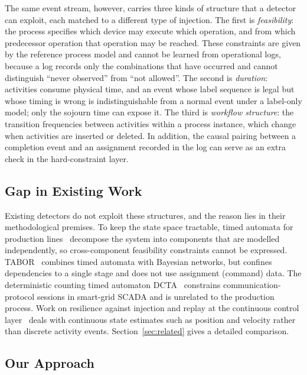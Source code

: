 \documentclass[manuscript,screen,review]{acmart}
\begin{document}
The same event stream, however, carries three kinds of structure that a detector can exploit, each matched to a different type of injection. The first is \emph{feasibility}: the process specifies which device may execute which operation, and from which predecessor operation that operation may be reached. These constraints are given by the reference process model and cannot be learned from operational logs, because a log records only the combinations that have occurred and cannot distinguish ``never observed'' from ``not allowed''. The second is \emph{duration}: activities consume physical time, and an event whose label sequence is legal but whose timing is wrong is indistinguishable from a normal event under a label-only model; only the sojourn time can expose it. The third is \emph{workflow structure}: the transition frequencies between activities within a process instance, which change when activities are inserted or deleted. In addition, the causal pairing between a completion event and an assignment recorded in the log can serve as an extra check in the hard-constraint layer.

\subsection{Gap in Existing Work}
\label{sec:intro_gap}

Existing detectors do not exploit these structures, and the reason lies in their methodological premises. To keep the state space tractable, timed automata for production lines~\cite{maier2011timed} decompose the system into components that are modelled independently, so cross-component feasibility constraints cannot be expressed. TABOR~\cite{lin2018tabor} combines timed automata with Bayesian networks, but confines dependencies to a single stage and does not use assignment (command) data. The deterministic counting timed automaton DCTA~\cite{barsha2024dcta} constrains communication-protocol sessions in smart-grid {SCADA} and is unrelated to the production process. Work on resilience against injection and replay at the continuous control layer~\cite{elsisi2023agv,mo2009replay} deals with continuous state estimates such as position and velocity rather than discrete activity events. Section~\ref{sec:related} gives a detailed comparison.

\subsection{Our Approach}
\label{sec:intro_method}
\end{document}
